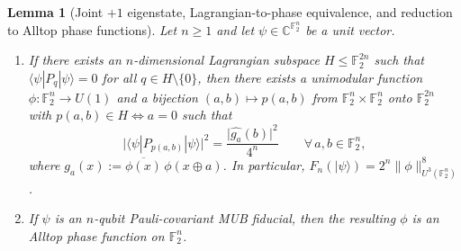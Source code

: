 \documentclass[11pt,a4paper]{article}
\theoremstyle{plain}
\newtheorem{lemma}{Lemma}[section]
\theoremstyle{definition}
\theoremstyle{remark}
\newcommand{\C}{\mathbb{C}}
\newcommand{\F}{\mathbb{F}}
\newcommand{\Uone}{U(1)}
\newcommand{\ket}[1]{|#1\rangle}
\newcommand{\expval}[2]{\langle#1|#2|#1\rangle}
\newcommand{\abs}[1]{\lvert#1\rvert}
\newcommand{\norm}[1]{\lVert#1\rVert}
\numberwithin{equation}{section}
\begin{document}
\begin{lemma}[Joint $+1$ eigenstate, Lagrangian-to-phase equivalence, and reduction to Alltop phase functions]\label{lem:mub-to-alltop}
Let $n \ge 1$ and let $\psi \in \C^{\F_2^n}$ be a unit vector.
\begin{enumerate}[label=(\roman*),leftmargin=2em]
  \item If there exists an $n$-dimensional Lagrangian subspace $H \le \F_2^{2n}$ such that $\expval{\psi}{P_q} = 0$ for all $q \in H \setminus \{0\}$, then there exists a unimodular function $\phi : \F_2^n \to \Uone$ and a bijection $(a, b) \mapsto p(a, b)$ from $\F_2^n \times \F_2^n$ onto $\F_2^{2n}$ with $p(a, b) \in H \iff a = 0$ such that
  \[
    \abs{\expval{\psi}{P_{p(a,b)}}}^2 = \frac{\abs{\widehat{g_a}(b)}^2}{4^n} \qquad \forall\, a, b \in \F_2^n,
  \]
  where $g_a(x) := \overline{\phi(x)}\,\phi(x \oplus a)$. In particular, $F_n(\ket{\psi}) = 2^n \norm{\phi}_{U^3(\F_2^n)}^8$.
  \item If $\psi$ is an $n$-qubit Pauli-covariant MUB fiducial, then the resulting $\phi$ is an Alltop phase function on $\F_2^n$.
\end{enumerate}
\end{lemma}
\end{document}
